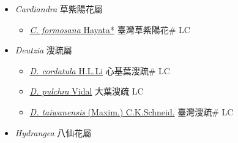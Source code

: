 
  \begin{itemize}
 \item[] \textit{Cardiandra} 草紫陽花屬
                    
  \begin{itemize}
        \item[] \href{http://www.theplantlist.org/tpl1.1/search?q=Cardiandra+formosana}{\textit{C. formosana} Hayata*}   臺灣草紫陽花\# LC
  \end{itemize}
 \item[] \textit{Deutzia} 溲疏屬
                    
  \begin{itemize}
        \item[] \href{http://www.theplantlist.org/tpl1.1/search?q=Deutzia+cordatula}{\textit{D. cordatula} H.L.Li}   心基葉溲疏\# LC
        \item[] \href{http://www.theplantlist.org/tpl1.1/search?q=Deutzia+pulchra}{\textit{D. pulchra} Vidal}   大葉溲疏 LC
        \item[] \href{http://www.theplantlist.org/tpl1.1/search?q=Deutzia+taiwanensis}{\textit{D. taiwanensis} (Maxim.) C.K.Schneid.}   臺灣溲疏\# LC
  \end{itemize}
 \item[] \textit{Hydrangea} 八仙花屬
                    

\end{itemize}
